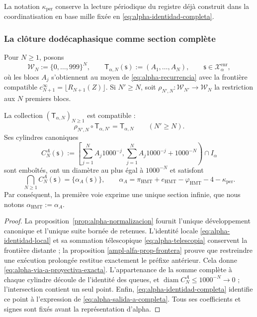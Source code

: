 La notation \(\kappa_{\mathrm{per}}\) conserve la lecture périodique du registre déjà construit dans la coordinatisation en base mille fixée en \eqref{eq:alpha-identidad-completa}.

\subsubsection{La clôture dodécaphasique comme section complète}

Pour \(N\geq1\), posons
\[
 \mathcal W_N:=\{0,\ldots,999\}^{N},
 \qquad
 \mathsf T_{\alpha,N}(\mathsf s):=(A_1,\ldots,A_N),
 \qquad \mathsf s\in\mathcal X_{\alpha}^{\mathrm{enr}},
\]
où les blocs \(A_j\) s'obtiennent au moyen de
\eqref{eq:alpha-recurrencia} avec la frontière compatible
\(c_{N+1}^{\infty}=\lfloor R_{N+1}(Z)\rfloor\). Si \(N'\geq N\), soit
\(\rho_{N',N}:\mathcal W_{N'}\to\mathcal W_N\) la restriction aux
\(N\) premiers blocs.

\begin{theorem}
\label{thm:alpha-salida-dodecafasica-completa}
La collection \((\mathsf T_{\alpha,N})_{N\geq1}\) est compatible :
\begin{equation}
 \rho_{N',N}\circ\mathsf T_{\alpha,N'}
 =\mathsf T_{\alpha,N}
 \qquad(N'\geq N).
 \label{eq:alpha-via-a-proyectiva-exacta}
\end{equation}
Ses cylindres canoniques
\begin{equation}
 C_N^A(\mathsf s):=
 \left[
  \sum_{j=1}^{N}A_j1000^{-j},
  \sum_{j=1}^{N}A_j1000^{-j}+1000^{-N}
 \right)\cap I_\alpha
 \label{eq:alpha-cilindros-via-a-exactos}
\end{equation}
sont emboîtés, ont un diamètre au plus égal à \(1000^{-N}\) et satisfont
\begin{equation}
 \bigcap_{N\geq1}C_N^A(\mathsf s)
 =\{\alpha_A(\mathsf s)\},
 \qquad
 \alpha_A
 =\pi_{\mathrm{HMT}}+e_{\mathrm{HMT}}-\varphi_{\mathrm{HMT}}
  -4-\kappa_{\mathrm{per}}.
 \label{eq:alpha-salida-a-completa}
\end{equation}
Par conséquent, la première voie exprime une unique section infinie, que
nous notons \(\alpha_{\mathrm{HMT}}:=\alpha_A\).
\end{theorem}

\begin{proof}
La proposition~\ref{prop:alpha-normalizacion} fournit l'unique développement
canonique et l'unique suite bornée de retenues. L'identité locale
\eqref{eq:alpha-identidad-local} et sa sommation télescopique
\eqref{eq:alpha-telescopia} conservent la frontière distante ; la proposition
\ref{ampl-alfa-prop-frontera} prouve que restreindre une exécution prolongée
restitue exactement le préfixe antérieur. Cela donne
\eqref{eq:alpha-via-a-proyectiva-exacta}. L'appartenance de la somme complète
à chaque cylindre découle de l'identité des queues, et
\(\operatorname{diam}C_N^A\leq1000^{-N}\to0\) ; l'intersection contient un
seul point. Enfin, \eqref{eq:alpha-identidad-completa} identifie ce
point à l'expression de \eqref{eq:alpha-salida-a-completa}. Tous ses
coefficients et signes sont fixés avant la représentation d'alpha.
\end{proof}


